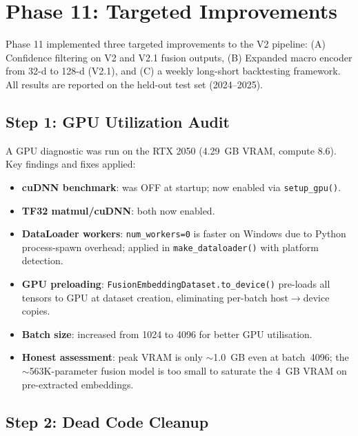 \documentclass[12pt,a4paper]{article}
\begin{document}
\section{Phase 11: Targeted Improvements}

Phase 11 implemented three targeted improvements to the V2 pipeline:
(A) Confidence filtering on V2 and V2.1 fusion outputs,
(B) Expanded macro encoder from 32-d to 128-d (V2.1), and
(C) a weekly long-short backtesting framework.
All results are reported on the held-out test set (2024--2025).

\subsection{Step 1: GPU Utilization Audit}

A GPU diagnostic was run on the RTX 2050 (4.29~GB VRAM, compute 8.6).
Key findings and fixes applied:

\begin{itemize}
    \item \textbf{cuDNN benchmark}: was OFF at startup; now enabled via
          \texttt{setup\_gpu()}.
    \item \textbf{TF32 matmul/cuDNN}: both now enabled.
    \item \textbf{DataLoader workers}: \texttt{num\_workers=0} is faster on
          Windows due to Python process-spawn overhead; applied in
          \texttt{make\_dataloader()} with platform detection.
    \item \textbf{GPU preloading}: \texttt{FusionEmbeddingDataset.to\_device()}
          pre-loads all tensors to GPU at dataset creation, eliminating
          per-batch host$\to$device copies.
    \item \textbf{Batch size}: increased from 1024 to 4096 for better GPU
          utilisation.
    \item \textbf{Honest assessment}: peak VRAM is only $\sim$1.0~GB even at
          batch~4096; the $\sim$563K-parameter fusion model is too small to
          saturate the 4~GB VRAM on pre-extracted embeddings.
\end{itemize}

\subsection{Step 2: Dead Code Cleanup}
\end{document}
